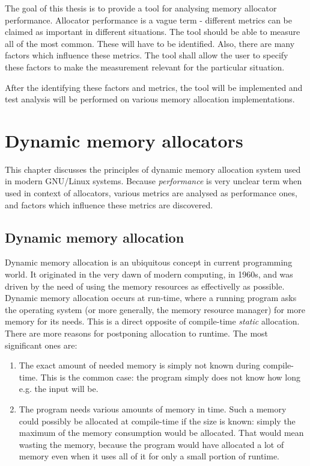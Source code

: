 The goal of this thesis is to provide a tool for analysing memory allocator performance. Allocator performance is a vague term - different metrics can be claimed as important in different situations. The tool should be able to measure all of the most common. These will have to be identified. Also, there are many factors which influence these metrics. The tool shall allow the user to specify these factors to make the measurement relevant for the particular situation.

After the identifying these factors and metrics, the tool will be implemented and test analysis will be performed on various memory allocation implementations.

\chapter{Dynamic memory allocators}

This chapter discusses the principles of dynamic memory allocation system used in modern GNU/Linux systems. Because {\em performance} is very unclear term when used in context of allocators, various metrics are analysed as performance ones, and factors which influence these metrics are discovered.

\section{Dynamic memory allocation}

Dynamic memory allocation is an ubiquitous concept in current programming world. It originated in the very dawn of modern computing, in 1960s, and was driven by the need of using the memory resources as effectivelly as possible. Dynamic memory allocation occurs at run-time, where a running program asks the operating system (or more generally, the memory resource manager) for more memory for its needs. This is a direct opposite of compile-time {\em static} allocation. There are more reasons for postponing allocation to runtime. The most significant ones are:
\begin{enumerate}
\item The exact amount of needed memory is simply not known during compile-time. This is the common case: the program simply does not know how long e.g. the input will be.
\item The program needs various amounts of memory in time. Such a memory could possibly be allocated at compile-time if the size is known: simply the maximum of the memory consumption would be allocated. That would mean wasting the memory, because the program would have allocated a lot of memory even when it uses all of it for only a small portion of runtime.
\end{enumerate}

